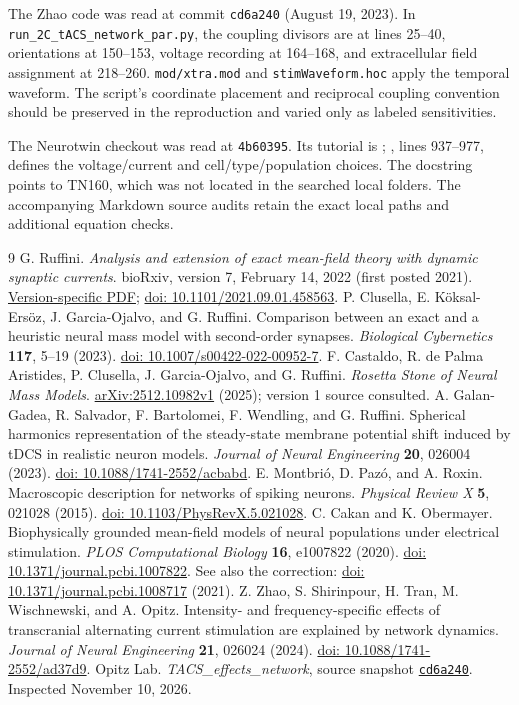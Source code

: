 \documentclass[11pt,a4paper]{article}
\newcommand{\doi}[1]{\href{https://doi.org/#1}{doi: #1}}
\begin{document}
The Zhao code was read at commit \texttt{cd6a240} (August 19, 2023). In \texttt{run\_2C\_tACS\_network\_par.py}, the coupling divisors are at lines 25--40, orientations at 150--153, voltage recording at 164--168, and extracellular field assignment at 218--260. \texttt{mod/xtra.mod} and \texttt{stimWaveform.hoc} apply the temporal waveform. The script's coordinate placement and reciprocal coupling convention should be preserved in the reproduction and varied only as labeled sensitivities.

The Neurotwin checkout was read at \texttt{4b60395}. Its tutorial is ; , lines 937--977, defines the voltage/current and cell/type/population choices. The docstring points to TN160, which was not located in the searched local folders. The accompanying Markdown source audits retain the exact local paths and additional equation checks.

\begin{thebibliography}{9}
 G. Ruffini. \emph{Analysis and extension of exact mean-field theory with dynamic synaptic currents}. bioRxiv, version 7, February 14, 2022 (first posted 2021). \href{https://www.biorxiv.org/content/10.1101/2021.09.01.458563v7.full.pdf}{Version-specific PDF}; \doi{10.1101/2021.09.01.458563}.
 P. Clusella, E. K\"oksal-Ers\"oz, J. Garcia-Ojalvo, and G. Ruffini. Comparison between an exact and a heuristic neural mass model with second-order synapses. \emph{Biological Cybernetics} \textbf{117}, 5--19 (2023). \doi{10.1007/s00422-022-00952-7}.
 F. Castaldo, R. de Palma Aristides, P. Clusella, J. Garcia-Ojalvo, and G. Ruffini. \emph{Rosetta Stone of Neural Mass Models}. \href{https://arxiv.org/abs/2512.10982v1}{arXiv:2512.10982v1} (2025); version 1 source consulted.
 A. Galan-Gadea, R. Salvador, F. Bartolomei, F. Wendling, and G. Ruffini. Spherical harmonics representation of the steady-state membrane potential shift induced by tDCS in realistic neuron models. \emph{Journal of Neural Engineering} \textbf{20}, 026004 (2023). \doi{10.1088/1741-2552/acbabd}.
 E. Montbri\'o, D. Paz\'o, and A. Roxin. Macroscopic description for networks of spiking neurons. \emph{Physical Review X} \textbf{5}, 021028 (2015). \doi{10.1103/PhysRevX.5.021028}.
 C. Cakan and K. Obermayer. Biophysically grounded mean-field models of neural populations under electrical stimulation. \emph{PLOS Computational Biology} \textbf{16}, e1007822 (2020). \doi{10.1371/journal.pcbi.1007822}. See also the correction: \doi{10.1371/journal.pcbi.1008717} (2021).
 Z. Zhao, S. Shirinpour, H. Tran, M. Wischnewski, and A. Opitz. Intensity- and frequency-specific effects of transcranial alternating current stimulation are explained by network dynamics. \emph{Journal of Neural Engineering} \textbf{21}, 026024 (2024). \doi{10.1088/1741-2552/ad37d9}.
 Opitz Lab. \emph{TACS\_effects\_network}, source snapshot \href{https://github.com/OpitzLab/TACS_effects_network/tree/cd6a240eba49604230b473440b20a85947884cd6}{\texttt{cd6a240}}. Inspected November 10, 2026.
\end{thebibliography}
\end{document}
